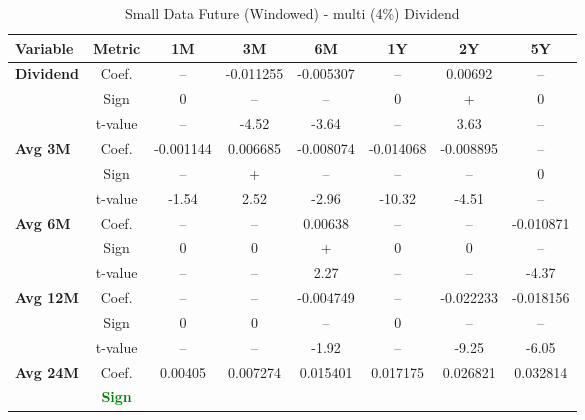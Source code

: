 \documentclass[11pt,english,a4paper,hidelinks]{book}
\begin{document}
\begin{table}[H]
    \centering
    \caption{Small Data Future (Windowed) - \acrshort{multi} (4\%) Dividend}
    \begin{tabular}{lccccccc}
        \toprule
        \textbf{Variable} & \textbf{Metric} & \textbf{1M} & \textbf{3M} & \textbf{6M} & \textbf{1Y} & \textbf{2Y} & \textbf{5Y} \\
        \midrule
        \multirow{3}{*}{\textbf{Dividend}}
            & Coef.   & --        & -0.011255 & -0.005307 & --        & 0.00692   & --        \\
            & Sign    & 0         & –         & –         & 0         & +         & 0         \\
            & t-value & --        & -4.52     & -3.64     & --        & 3.63      & --        \\
        \cmidrule{1-8}
        \multirow{3}{*}{\textbf{Avg 3M}}
            & Coef.   & -0.001144 & 0.006685  & -0.008074 & -0.014068 & -0.008895 & --        \\
            & Sign    & –         & +         & –         & –         & –         & 0         \\
            & t-value & -1.54     & 2.52      & -2.96     & -10.32    & -4.51     & --        \\
        \cmidrule{1-8}
        \multirow{3}{*}{\textbf{Avg 6M}}
            & Coef.   & --        & --        & 0.00638   & --        & --        & -0.010871 \\
            & Sign    & 0         & 0         & +         & 0         & 0         & –         \\
            & t-value & --        & --        & 2.27      & --        & --        & -4.37     \\
        \cmidrule{1-8}
        \multirow{3}{*}{\textbf{Avg 12M}}
            & Coef.   & --        & --        & -0.004749 & --        & -0.022233 & -0.018156 \\
            & Sign    & 0         & 0         & –         & 0         & –         & –         \\
            & t-value & --        & --        & -1.92     & --        & -9.25     & -6.05     \\
        \cmidrule{1-8}
        \multirow{3}{*}{\textbf{Avg 24M}}
            & Coef.   & 0.00405   & 0.007274  & 0.015401  & 0.017175  & 0.026821  & 0.032814  \\
            & \textbf{\textcolor{green}{Sign}}

\end{tabular}
\end{table}
\end{document}
